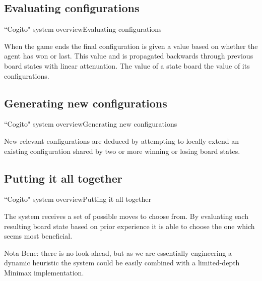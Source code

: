 



\subsection{Evaluating configurations}
\begin{frame}{``Cogito" system overview}{Evaluating configurations}

When the game ends the final configuration is given a value based on whether the 
agent has won or last. This value and is propagated backwards through previous
board states with linear attenuation. The value of a state board the value 
of its configurations.

\end{frame}

\subsection{Generating new configurations}
\begin{frame}{``Cogito" system overview}{Generating new configurations}

New relevant configurations are deduced by attempting to locally extend an 
existing configuration shared by two or more winning or losing board states.

\end{frame}

\subsection{Putting it all together}
\begin{frame}{``Cogito" system overview}{Putting it all together}

The system receives a set of possible moves to choose from. By evaluating each 
resulting board state based on prior experience it is able to choose the one 
which seems most beneficial.

Nota Bene: there is no look-ahead, but as we are essentially engineering a 
dynamic heuristic the system could be easily combined with a limited-depth 
Minimax implementation.

\end{frame}